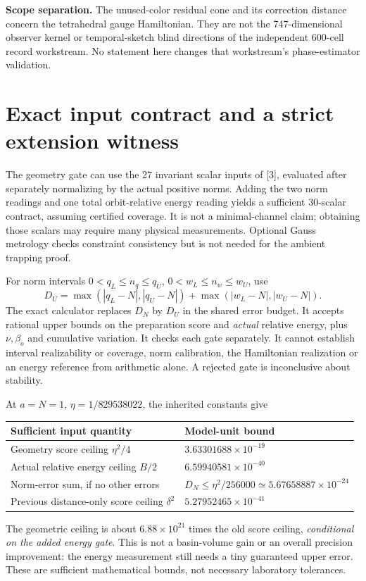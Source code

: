 \documentclass[11pt,a4paper]{article}
\begin{document}
\textbf{Scope separation.} The unused-color residual cone and its correction distance concern the tetrahedral gauge Hamiltonian. They are not the 747-dimensional observer kernel or temporal-sketch blind directions of the independent 600-cell record workstream. No statement here changes that workstream's phase-estimator validation.
\newpage
\section{Exact input contract and a strict extension witness}
The geometry gate can use the 27 invariant scalar inputs of [3], evaluated after separately normalizing by the actual positive norms. Adding the two norm readings and one total orbit-relative energy reading yields a sufficient 30-scalar contract, assuming certified coverage. It is not a minimal-channel claim; obtaining those scalars may require many physical measurements. Optional Gauss metrology checks constraint consistency but is not needed for the ambient trapping proof.

For norm intervals $0<q_L\le n_q\le q_U$, $0<w_L\le n_w\le w_U$, use
\[
D_U=\max(|q_L-N|,|q_U-N|)+\max(|w_L-N|,|w_U-N|).
\]
The exact calculator replaces $D_N$ by $D_U$ in the shared error budget. It accepts rational upper bounds on the preparation score and \emph{actual} relative energy, plus $\nu,\beta_o$ and cumulative variation. It checks each gate separately. It cannot establish interval realizability or coverage, norm calibration, the Hamiltonian realization or an energy reference from arithmetic alone. A rejected gate is inconclusive about stability.

At $a=N=1$, $\eta=1/829538022$, the inherited constants give
\begin{center}
\begin{tabular}{ll}\toprule
Sufficient input quantity & Model-unit bound\\\midrule
Geometry score ceiling $\eta^2/4$ & $3.63301688\times10^{-19}$\\
Actual relative energy ceiling $B/2$ & $6.59940581\times10^{-40}$\\
Norm-error sum, if no other errors & $D_N\le\eta^2/256000\simeq5.67658887\times10^{-24}$\\
Previous distance-only score ceiling $\delta^2$ & $5.27952465\times10^{-41}$\\\bottomrule
\end{tabular}
\end{center}
The geometric ceiling is about $6.88\times10^{21}$ times the old score ceiling, \emph{conditional on the added energy gate}. This is not a basin-volume gain or an overall precision improvement: the energy measurement still needs a tiny guaranteed upper error. These are sufficient mathematical bounds, not necessary laboratory tolerances.
\end{document}
